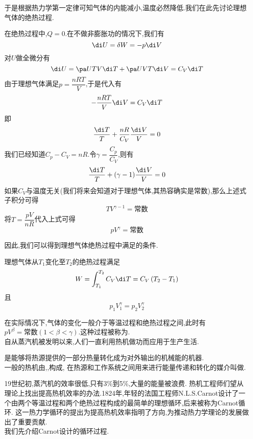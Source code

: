 \documentclass{ctexart}
\begin{document}
于是根据热力学第一定律可知气体的内能减小,温度必然降低.我们在此先讨论理想气体的绝热过程.
\begin{derivation}
    在绝热过程中,$Q=0$.在不做非膨胀功的情况下,我们有
    \[\di U=\delta W=-p\di V\]
    对$U$做全微分有
    \[\di U=\pa UTV\di T+\pa UVT\di V=C_V\di T\]
    由于理想气体满足$p=\dfrac{nRT}{V}$,于是代入有
    \[-\dfrac{nRT}{V}\di V=C_V\di T\]
    即
    \[\dfrac{\di T}{T}+\dfrac{nR}{C_V}\dfrac{\di V}{V}=0\]
    我们已经知道$C_p-C_V=nR$.令$\gamma=\dfrac{C_p}{C_V}$,则有
    \[\dfrac{\di T}{T}+(\gamma-1)\dfrac{\di V}{V}=0\]
    如果$C_V$与温度无关(我们将来会知道对于理想气体,其热容确实是常数),那么上述式子积分可得
    \[TV^{\gamma-1}=\text{常数}\]
    将$T=\dfrac{pV}{nR}$代入上式可得
    \[pV^\gamma=\text{常数}\]

\end{derivation}
因此,我们可以得到理想气体绝热过程中满足的条件.
\begin{theorem}[2C.1.3 理想气体的绝热过程]
    理想气体从$T_1$变化至$T_2$的绝热过程满足
    \[W=\int_{T_1}^{T_2}C_V\di T=C_V\left(T_2-T_1\right)\]
    且
    \[p_1V_1^\gamma=p_2V_2^\gamma\]

\end{theorem}
在实际情况下,气体的变化一般介于等温过程和绝热过程之间,此时有%
$pV^\beta=\text{常数}(1<\beta<\gamma)$.这种过程被称为.\vspace{12pt}\\
\indent 自从蒸汽机被发明以来,人们一直利用热机做功而应用于生产生活.
\begin{definition}[2C.2.1 热机]
    是能够将热源提供的一部分热量转化成为对外输出的机械能的机器.\\
    一般的热机由\footnotemark,,构成,%
    在热源和工作系统之间用来进行能量传递和转化的媒介叫做.
\end{definition}
\indent 19世纪初,蒸汽机的效率很低,只有3\%到5\%,大量的能量被浪费.%
热机工程师们望从理论上找出提高热机效率的办法.1824年,年轻的法国工程师N.L.S.Carnot设计了一个由两个等温过程和两个绝热过程构成的最简单的理想循环,后来被称为Carnot循环.%
这一热力学循环的提出为提高热机效率指明了方向,为推动热力学理论的发展做出了重要贡献.\vspace{4pt}\\
\indent 我们先介绍Carnot设计的循环过程.
\begin{figure}[H]
    \centering
\end{figure}
\end{document}
